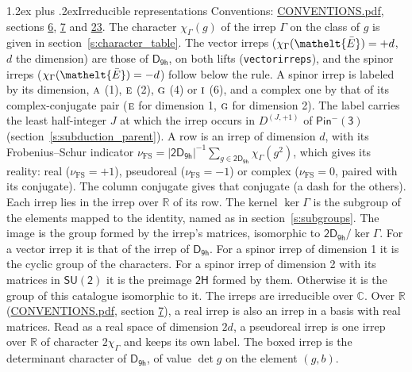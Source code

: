 \documentclass[10pt,a4paper]{article}
\makeatletter
\renewcommand\section{\@startsection{section}{1}{\z@}{-3ex plus -1ex minus -.2ex}%
  {1.2ex plus .2ex}{\normalfont\large\sffamily\bfseries\color{parttitle}}}
\numberwithin{equation}{section}
\newcommand{\eltfont}[1]{{\let\sigma\eltsigma\mathelt{#1}}}
\newcommand{\grp}[1]{\mathsf{#1}}
\newcommand{\irr}[1]{\text{\normalfont\scshape #1}}
\newcommand{\elt}[1]{\eltfont{#1}}
\newcommand{\irrJp}[2]{D^{(#1,#2)}}
\newcommand{\irchar}[1]{\chi_{#1}}
\newcommand{\fsind}{\nu_{\mathrm{FS}}}
\newcommand{\barred}[1]{\bar{#1}}
\makeatother
\begin{document}
\section{Irreducible representations}\label{s:irreps}
Conventions: \href{../../CONVENTIONS.pdf}{CONVENTIONS.pdf}, sections \href{../../../rotation/CONVENTIONS.pdf\#conv.6}{6}, \href{../../../rotation/CONVENTIONS.pdf\#conv.7}{7} and \href{../../CONVENTIONS.pdf\#conv.23}{23}.
\leavevmode\label{n:function.character}\label{n:irrep.Gamma}The character $\irchar{\Gamma}(g)$ of the irrep $\Gamma$ on the class of $g$ is given in section~\ref{s:character_table}. \label{n:index.dimension}The vector irreps ($\irchar{\Gamma}(\elt{\barred{E}}) = +d$, $d$ the dimension) are those of \href{../../../rotation/data/pdf/D9h.pdf}{$\grp{D_{9h}}$}, on both lifts (\texttt{vectorirreps}), and the spinor irreps ($\irchar{\Gamma}(\elt{\barred{E}}) = -d$) follow below the rule. A spinor irrep is labeled by its dimension, $\irr{a}$ (1), $\irr{e}$ (2), $\irr{g}$ (4) or $\irr{i}$ (6), and a complex one by that of its complex-conjugate pair ($\irr{e}$ for dimension 1, $\irr{g}$ for dimension 2). The label carries the least half-integer $J$ at which the irrep occurs in $\irrJp{J}{+1}$ of $\grp{Pin^{-}(3)}$ (section~\ref{s:subduction_parent}).
\leavevmode\label{n:index.frobenius}\label{n:head.irrep}\label{n:head.reality}A row is an irrep of dimension $d$, with its Frobenius--Schur indicator $\fsind = |\grp{2D_{9h}}|^{-1}\allowbreak\sum_{g\in\grp{2D_{9h}}}\irchar{\Gamma}(g^2)$, which gives its reality: real ($\fsind = +1$), pseudoreal ($\fsind = -1$) or complex ($\fsind = 0$, paired with its conjugate). \label{n:head.conjugate}The column conjugate gives that conjugate (a dash for the others). \label{n:head.over.real}Each irrep lies in the irrep over $\mathbb{R}$ of its row. \label{n:head.kernel}The kernel $\ker\Gamma$ is the subgroup of the elements mapped to the identity, named as in section~\ref{s:subgroups}. \label{n:head.image}The image is the group formed by the irrep's matrices, isomorphic to $\grp{2D_{9h}}/\ker\Gamma$. For a vector irrep it is that of the irrep of \href{../../../rotation/data/pdf/D9h.pdf}{$\grp{D_{9h}}$}. For a spinor irrep of dimension 1 it is the cyclic group of the characters. For a spinor irrep of dimension 2 with its matrices in $\grp{SU(2)}$ it is the preimage $\grp{2H}$ formed by them. Otherwise it is the group of this catalogue isomorphic to it. The irreps are irreducible over $\mathbb{C}$. Over $\mathbb{R}$ (\href{../../CONVENTIONS.pdf}{CONVENTIONS.pdf}, section \href{../../../rotation/CONVENTIONS.pdf\#conv.7}{7}), a real irrep is also an irrep in a basis with real matrices. Read as a real space of dimension $2d$, a pseudoreal irrep is one irrep over $\mathbb{R}$ of character $2\irchar{\Gamma}$ and keeps its own label. \label{n:mark.determinant}The boxed irrep is the determinant character of \href{../../../rotation/data/pdf/D9h.pdf}{$\grp{D_{9h}}$}, of value $\det g$ on the element $(g, b)$.
\end{document}
